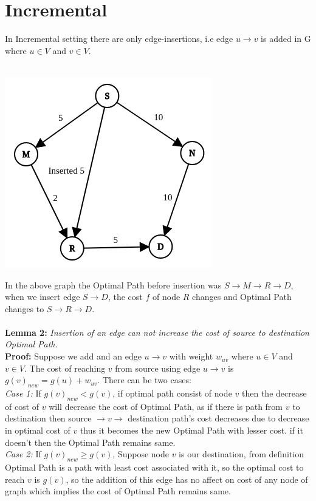 \documentclass[a4paper]{article}
\begin{document}
\section{Incremental}
In Incremental setting there are only edge-insertions, i.e edge $u \rightarrow v $ is added in G where $u\in V $ and $v \in V$.\\
\\
\begin{center}
    \includegraphics[scale=0.4]{img/insert1.png}
\end{center}
In the above graph the Optimal Path before insertion was $S \rightarrow M \rightarrow R \rightarrow D$, when we insert edge $S \rightarrow D$, the cost $f$ of node $R$ changes and Optimal Path changes to $S \rightarrow R \rightarrow D$.\\
\\
\hypertarget{Lemma 2}{\textbf{Lemma 2:}} \textit{Insertion of an edge can not increase the cost of source to destination Optimal Path.}\\
\textbf{Proof:} Suppose we add and an edge $u \rightarrow v $ with weight $w_{uv}$ where $u \in V$ and $v \in V$. The cost of reaching $v$ from source using edge $u \rightarrow v$ is $g(v)_{new} = g(u) + w_{uv}$. There can be two cases:\\
\textit{Case 1:} If $g(v)_{new} < g(v)$, if optimal path consist of node $v$ then the decrease of cost of $v$ will decrease the cost of Optimal Path, as if there is path from $v$ to destination then source $\rightarrow v \rightarrow$ destination path's cost decreases due to decrease in optimal cost of $v$ thus it becomes the new Optimal Path with lesser cost. if it doesn't then the Optimal Path remains same.\\
\textit{Case 2:} If $g(v)_{new} \geq g(v)$,  Suppose node $v$ is our destination, from definition Optimal Path is a path with least cost associated with it, so the optimal cost to reach $v$ is $g(v)$, so the addition of this edge has no affect on cost of any node of graph which implies the cost of Optimal Path remains same.\\
\end{document}
